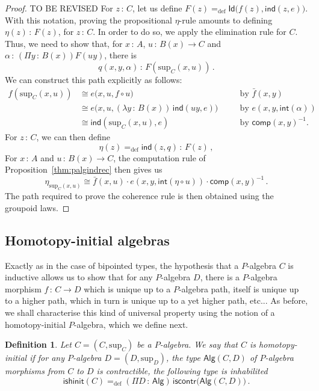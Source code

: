\documentclass[10pt,a4paper,oneside,reqno]{amsart}
\numberwithin{equation}{section}
\theoremstyle{mythm}
\theoremstyle{mydef}
\newtheorem{definition}[theorem]{Definition}
\theoremstyle{myrmk}
\newcommand{\ie}{\text{i.e.\ }}
\newcommand{\by}[1]{\quad&&\text{by {$#1$}}}
\newcommand{\defeq}{=_{\mathrm{def}}}
\newcommand{\co}{\,{:}\,}
\newcommand{\iso}{\cong}
\newcommand{\iscontr}{\mathsf{iscontr}}
\newcommand{\isalghinit}{\mathsf{ishinit}}
\renewcommand{\int}{\mathsf{int}}
\newcommand{\Id}{\mathsf{Id}}
\newcommand{\ind}{\mathsf{ind}}
\newcommand{\comp}{\mathsf{comp}}
\newcommand{\Palg}{\mathsf{Alg}}
\renewcommand{\sup}{\mathrm{sup}}
\begin{document}
\begin{proof} TO BE REVISED For $z \co C$, let us define $F(z) \defeq \Id \big(   f(z), \ind(z,e))$. With this notation, proving
 the propositional $\eta$-rule amounts to defining $\eta(z) \co F(z)$, for $z \co C$. In order to do so, we apply
the elimination rule for $C$. Thus, we need to show that, for $x \co A$, $u \co B(x) \to C$ and~$\alpha \co 
(\Pi y \co B(x)) F(uy)$, there 
is 
\[
q(x,y,\alpha) \co   F(\sup_C(x,u)) \, .
\]
We can construct this path explicitly as follows:
\begin{align*}
f(\sup_C(x,u)) &\iso e\big(x,u , f \circ u \big)   \by{\bar{f}(x,y)}\\
	&\iso e\big(x,u, (\lambda y \co B(x) )\, \ind(u y ,e) \big) \by{e(x,y,\int(\alpha))}\\
	& \iso \ind(\sup_C(x,u),e) \by{\comp(x,y)^{-1}}.
\end{align*}
For $z \co C$, we can then define
\[
\eta(z) \defeq \ind(z,q) \co F(z) \, ,
\] 
For $x \co A$ and $u \co B(x) \to C$, the  computation rule of Proposition~\ref{thm:palgindrec} then gives us
\[
 \eta_{\sup_C(x,u)} \iso  \bar{f}(x,u) \cdot e(x,y,\int(  \eta \circ u ))  \cdot  \comp(x,y)^{-1} \, .
\]
The path required to prove  the coherence rule is then obtained using the groupoid laws.
\end{proof}


\subsection{Homotopy-initial algebras}
Exactly as in the case of bipointed types, the hypothesis that a $P$-algebra $C$ is inductive allows us to show that for any
$P$-algebra $D$, there is a $P$-algebra morphism $f \co C \to D$ which is unique up to a $P$-algebra path, itself is unique up 
to a higher path, which in turn is unique up to a yet higher path, etc... As before, we shall characterise this kind of universal property
using the notion of a homotopy-initial $P$-algebra, which we define next.

\begin{definition}\label{def:AlgInit}
Let $C = (C, \sup_C)$ be a $P$-algebra. We say that $C$ is  \emph{homotopy-initial}  if for any $P$-algebra 
$D = (D, \sup_D)$, the type $\Palg(C,D)$ of $P$-algebra morphisms from $C$ to $D$
is contractible, \ie the following type is inhabilited
\[
\isalghinit(C) \defeq
 (\Pi D \co \Palg)  \, \iscontr \big( \Palg(C,D) \big)  \, .
\]  
\end{definition}
\end{document}
